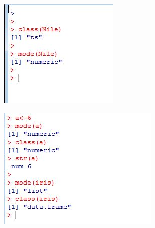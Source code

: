 \documentclass{beamer}
\begin{document}
 	\begin{frame}
 		\begin{figure}
 			\centering
 			\includegraphics[width=0.7\linewidth]{images/classnile}
 		\end{figure}
 		
 		
 	\end{frame}
 	\begin{frame}
 		\begin{figure}
 			\centering
 			\includegraphics[width=0.9\linewidth]{images/modeclass}
 			
 		\end{figure}
 		
 		
 	\end{frame}
 	
\end{document}

